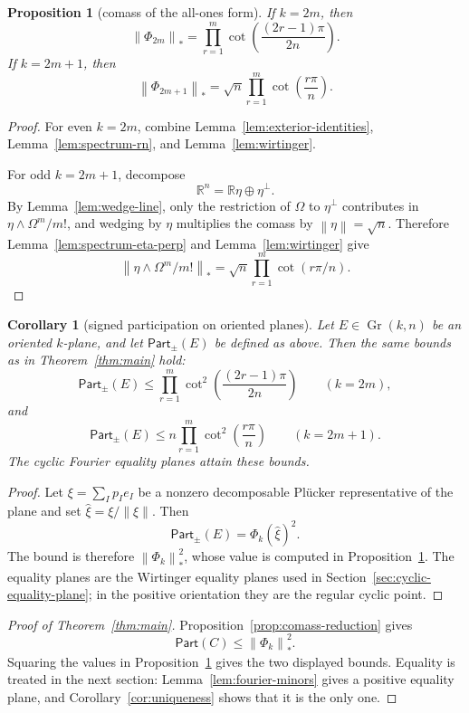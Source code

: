 \documentclass[11pt]{article}
\newtheorem{proposition}[theorem]{Proposition}
\newtheorem{corollary}[theorem]{Corollary}
\newcommand{\Gr}{\operatorname{Gr}}
\newcommand{\Part}{\mathsf{Part}}
\newcommand{\R}{\mathbb{R}}
\newcommand{\norm}[1]{\left\|#1\right\|}
\begin{document}
\begin{proposition}[comass of the all-ones form]
\label{prop:comass-values}
If \(k=2m\), then
\[
  \norm{\Phi_{2m}}_*
  =
  \prod_{r=1}^{m}\cot\!\left(\frac{(2r-1)\pi}{2n}\right).
\]
If \(k=2m+1\), then
\[
  \norm{\Phi_{2m+1}}_*
  =
  \sqrt{n}\prod_{r=1}^{m}\cot\!\left(\frac{r\pi}{n}\right).
\]
\end{proposition}

\begin{proof}
For even \(k=2m\), combine Lemma~\ref{lem:exterior-identities},
Lemma~\ref{lem:spectrum-rn}, and Lemma~\ref{lem:wirtinger}.

For odd \(k=2m+1\), decompose
\[
  \R^n=\R\eta\oplus\eta^\perp.
\]
By Lemma~\ref{lem:wedge-line}, only the restriction of \(\Omega\) to
\(\eta^\perp\) contributes in \(\eta\wedge\Omega^m/m!\), and wedging by
\(\eta\) multiplies the comass by \(\norm{\eta}=\sqrt n\).  Therefore
Lemma~\ref{lem:spectrum-eta-perp} and Lemma~\ref{lem:wirtinger} give
\[
  \norm{\eta\wedge\Omega^m/m!}_*
  =
  \sqrt n\prod_{r=1}^{m}\cot(r\pi/n).
\]
\end{proof}

\begin{corollary}[signed participation on oriented planes]
\label{cor:signed-oriented-planes}
Let \(E\in\Gr(k,n)\) be an oriented \(k\)-plane, and let
\(\Part_{\pm}(E)\) be defined as above.  Then the same bounds as in
Theorem~\ref{thm:main} hold:
\[
  \Part_{\pm}(E)
  \leq
  \prod_{r=1}^{m}\cot^2\!\left(\frac{(2r-1)\pi}{2n}\right)
  \qquad (k=2m),
\]
and
\[
  \Part_{\pm}(E)
  \leq
  n\prod_{r=1}^{m}\cot^2\!\left(\frac{r\pi}{n}\right)
  \qquad (k=2m+1).
\]
The cyclic Fourier equality planes attain these bounds.
\end{corollary}

\begin{proof}
Let \(\xi=\sum_I p_Ie_I\) be a nonzero decomposable Plücker representative of
the plane and set \(\widehat{\xi}=\xi/\norm{\xi}\).  Then
\[
  \Part_{\pm}(E)=\Phi_k(\widehat{\xi})^2.
\]
The bound is therefore \(\norm{\Phi_k}_*^2\), whose value is computed in
Proposition~\ref{prop:comass-values}.  The equality planes are the Wirtinger
equality planes used in Section~\ref{sec:cyclic-equality-plane}; in the
positive orientation they are the regular cyclic point.
\end{proof}

\begin{proof}[Proof of Theorem~\ref{thm:main}]
Proposition~\ref{prop:comass-reduction} gives
\[
  \Part(C)\leq \norm{\Phi_k}_*^2.
\]
Squaring the values in Proposition~\ref{prop:comass-values} gives the two
displayed bounds.  Equality is treated in the next section:
Lemma~\ref{lem:fourier-minors} gives a positive equality plane, and
Corollary~\ref{cor:uniqueness} shows that it is the only one.
\end{proof}
\end{document}
